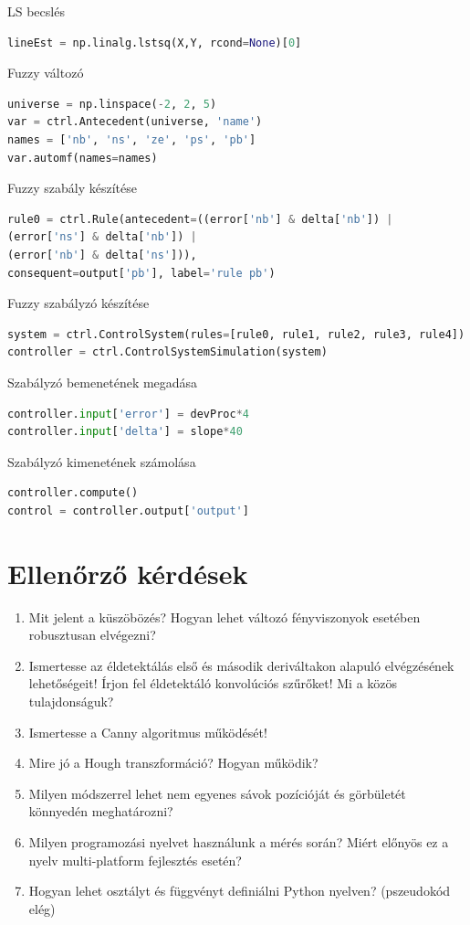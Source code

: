 \documentclass[12pt,a4paper,oneside]{report}             %
\begin{document}
LS becslés

\begin{lstlisting}[language=Python]
lineEst = np.linalg.lstsq(X,Y, rcond=None)[0]
\end{lstlisting}

Fuzzy változó

\begin{lstlisting}[language=Python]
universe = np.linspace(-2, 2, 5)
var = ctrl.Antecedent(universe, 'name')
names = ['nb', 'ns', 'ze', 'ps', 'pb']
var.automf(names=names)
\end{lstlisting}

Fuzzy szabály készítése

\begin{lstlisting}[language=Python]
rule0 = ctrl.Rule(antecedent=((error['nb'] & delta['nb']) |
(error['ns'] & delta['nb']) |
(error['nb'] & delta['ns'])),
consequent=output['pb'], label='rule pb')
\end{lstlisting}

Fuzzy szabályzó készítése

\begin{lstlisting}[language=Python]
system = ctrl.ControlSystem(rules=[rule0, rule1, rule2, rule3, rule4])
controller = ctrl.ControlSystemSimulation(system)
\end{lstlisting}

Szabályzó bemenetének megadása

\begin{lstlisting}[language=Python]
controller.input['error'] = devProc*4
controller.input['delta'] = slope*40
\end{lstlisting}

Szabályzó kimenetének számolása

\begin{lstlisting}[language=Python]
controller.compute()
control = controller.output['output']
\end{lstlisting}

\chapter{Ellenőrző kérdések}

\begin{enumerate}
\item Mit jelent a küszöbözés? Hogyan lehet változó fényviszonyok esetében robusztusan elvégezni?
\item Ismertesse az éldetektálás első és második deriváltakon alapuló elvégzésének lehetőségeit! Írjon fel éldetektáló konvolúciós szűrőket! Mi a közös tulajdonságuk?
\item Ismertesse a Canny algoritmus működését!
\item Mire jó a Hough transzformáció? Hogyan működik?
\item Milyen módszerrel lehet nem egyenes sávok pozícióját és görbületét könnyedén meghatározni?
\item Milyen programozási nyelvet használunk a mérés során? Miért előnyös ez a nyelv multi-platform fejlesztés esetén?
\item Hogyan lehet osztályt és függvényt definiálni Python nyelven? (pszeudokód elég)
\end{enumerate}

\printbibliography
\end{document}
